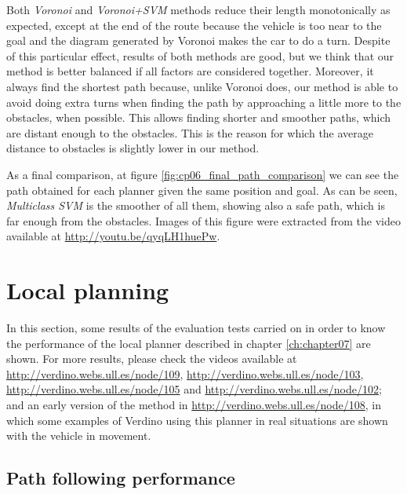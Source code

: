 Both \textit{Voronoi} and \textit{Voronoi+\ac{SVM}} methods reduce their length monotonically as expected, except at the end of the route because the vehicle is too near to the goal and the diagram generated by Voronoi makes the car to do a turn. Despite of this particular effect, results of both methods are good, but we think that our method is better balanced if all factors are considered together. Moreover, it always find the shortest path because, unlike Voronoi does, our method is able to avoid doing extra turns when finding the path by approaching a little more to the obstacles, when possible. This allows finding shorter and smoother paths, which are distant enough to the obstacles. This is the reason for which the average distance to obstacles is slightly lower in our method.

As a final comparison, at figure \ref{fig:cp06_final_path_comparison} we can see the path obtained for each planner given the same position and goal. As can be seen, \textit{Multiclass \ac{SVM}} is the smoother of all them, showing also a safe path, which is far enough from the obstacles. Images of this figure were extracted from the video available at \url{http://youtu.be/qyqLH1huePw}.

\graphicspath{{./images/chapter07/bmps/}{./images/chapter07/vects/}{./images/chapter07/}}

\section{Local planning}\label{ch:chapter07_02}

In this section, some results of the evaluation tests carried on in order to know the performance of the local planner described in chapter \ref{ch:chapter07} are shown. For more results, please check the videos available at \url{http://verdino.webs.ull.es/node/109}, \url{http://verdino.webs.ull.es/node/103}, \url{http://verdino.webs.ull.es/node/105} and \url{http://verdino.webs.ull.es/node/102}; and an early version of the method in \url{http://verdino.webs.ull.es/node/108}, in which some examples of Verdino using this planner in real situations are shown with the vehicle in movement.

\subsection{Path following performance}\label{ch:chapter07_02_01}

